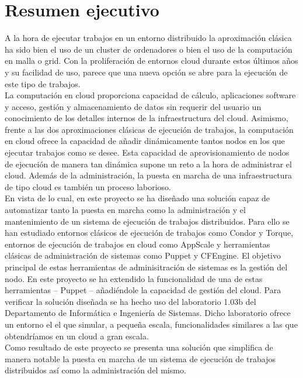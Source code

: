 \chapter{Resumen ejecutivo}
\label{cap:resumen}


A la hora de ejecutar trabajos en un entorno distribuido la aproximación clásica ha sido bien el uso de un cluster de ordenadores o bien el uso de la computación en malla o grid. Con la proliferación de entornos cloud durante estos últimos años y su facilidad de uso, parece que una nueva opción se abre para la ejecución de este tipo de trabajos.\\

La computación en cloud proporciona capacidad de cálculo, aplicaciones software y acceso, gestión y almacenamiento de datos sin requerir del usuario un conocimiento de los detalles internos de la infraestructura del cloud. Asimismo, frente a las dos aproximaciones clásicas de ejecución de trabajos, la computación en cloud ofrece la capacidad de añadir dinámicamente tantos nodos en los que ejecutar trabajos como se desee. Esta capacidad de aprovisionamiento de nodos de ejecución de manera tan dinámica supone un reto a la hora de administrar el cloud. Además de la administración, la puesta en marcha de una infraestructura de tipo cloud es también un proceso laborioso.\\

En vista de lo cual, en este proyecto se ha diseñado una solución capaz de automatizar tanto la puesta en marcha como la administración y el mantenimiento de un sistema de ejecución de trabajos distribuidos. Para ello se han estudiado entornos clásicos de ejecución de trabajos como Condor y Torque, entornos de ejecución de trabajos en cloud como AppScale y herramientas clásicas de administración de sistemas como Puppet y CFEngine. El objetivo principal de estas herramientas de adminisitración de sistemas es la gestión del nodo. En este proyecto se ha extendido la funcionalidad de una de estas herramientas -- Puppet -- añadiéndole la capacidad de gestión del cloud. Para verificar la solución diseñada se ha hecho uso del laboratorio 1.03b del Departamento de Informática e Ingeniería de Sistemas. Dicho laboratorio ofrece un entorno el el que simular, a pequeña escala, funcionalidades similares a las que obtendríamos en un cloud a gran escala.\\

Como resultado de este proyecto se presenta una solución que simplifica de manera notable la puesta en marcha de un sistema de ejecución de trabajos distribuidos así como la administración del mismo.
